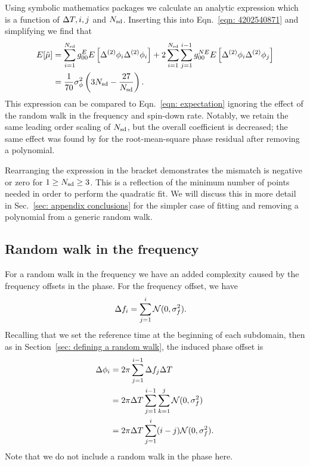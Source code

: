 \documentclass[../full_thesis/full_thesis.tex]{subfiles}
\begin{document}
Using symbolic mathematics packages we
calculate an analytic expression which is a function of $\Delta T, i, j$ and $N_{\textrm{sd}}$.
Inserting this into Eqn.~\eqref{eqn: 4202540871} and simplifying we find that
\begin{align}
E[\tilde{\mu}]  & = \sum_{i=1}^{N_{\textrm{sd}}}g_{00}^{E} E\left[\Delta^{(2)}\phi_{i}\Delta^{(2)}\phi_{i}\right]
+ 2 \sum_{i=1}^{N_{\textrm{sd}}}\sum_{j=1}^{i-1}g_{00}^{NE}E\left[\Delta^{(2)}\phi_{i}\Delta^{(2)}\phi_{j}\right]  \\
& = \frac{1}{70}\sigma_{\phi}^{2}\left(3N_{\textrm{sd}} - \frac{27}{N_{\textrm{sd}}}\right).
\label{eqn: Expected mismatch RW in phase k2}
\end{align}
This expression can be compared to Eqn.~\eqref{eqn: expectation} ignoring the
effect of the random walk in the frequency and spin-down rate. Notably, we
retain the same leading order scaling of $N_{\textrm{sd}}$, but the overall coefficient is
decreased; the same effect was found by \citet{Cordes1980} for the
root-mean-square phase residual after removing a polynomial.

Rearranging the expression in the bracket demonstrates the mismatch is negative
or zero for $1 \ge N_{\textrm{sd}} \ge 3$. This is a reflection of the minimum number of
points needed in order to perform the quadratic fit. We will discuss this in more
detail in Sec.~\ref{sec: appendix conclusions} for the simpler case of fitting
and removing a polynomial from a generic random walk.

\subsection{Random walk in the frequency}

For a random walk in the frequency we have an added complexity caused by
the frequency offsets in the phase. For the frequency offset, we
have
\begin{align}
\Delta f_{i} &= \sum_{j=1}^{i}\mathcal{N}(0, \sigma_{f}^{2}).
\end{align}
Recalling that we set the reference time at the beginning of each subdomain,
then as in Section~\ref{sec: defining a random walk}, the induced phase offset is
\begin{align}
\Delta\phi_{i} &=2\pi \sum_{j=1}^{i-1}\Delta f_{j}\Delta T \\
 & = 2\pi\Delta T \sum_{j=1}^{i-1}\sum_{k=1}^{j}\mathcal{N}(0, \sigma_{f}^{2}) \\
& = 2\pi\Delta T \sum_{j=1}^{i}(i-j)\mathcal{N}(0, \sigma_{f}^{2}).
\label{eqn: P2F}
\end{align}
Note that we do not include a random walk in the phase here.
\end{document}
